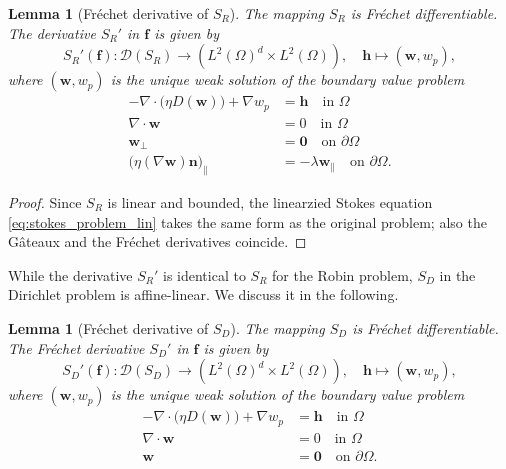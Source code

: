\documentclass[final,leqno]{scrarticle}
\newtheorem{lemma}[theorem]{Lemma}
\newcommand{\lzo}{L^2(\Omega)}
\newcommand{\lzd}{{L^2(\Omega)^d}}
\begin{document}
\begin{lemma}[Fr\'echet derivative of $S_R$]
 The mapping $S_R$ is Fr\'echet differentiable. The %
 derivative ${S_R}'%
 $ in $\mathbf{f}$ is given by
 \begin{displaymath}
  S_R'(\mathbf{f}) : \mathcal{D}(S_R) \to \left(\lzd \times \lzo\right), \quad \mathbf{h} \mapsto (\mathbf{\mathbf{w}},w_p) ,
 \end{displaymath}
 where $\left(\mathbf{\mathbf{w}},w_p\right)$ is the unique weak solution of the boundary value problem
 \begin{equation} \label{eq:stokes_problem_lin}
 \begin{split}
  -\nabla \cdot \big( \eta D(\mathbf{w}) \big) + \nabla w_p &= \mathbf{h} \quad \text{in } \Omega\\
  \nabla \cdot \mathbf{w} &= 0 \quad \text{in } \Omega\\
  \mathbf{w}_{\bot} &= \mathbf{0} \quad \text{on } \partial\Omega \\
  \big(\eta (\nabla \mathbf{w})\mathbf{n} \big)_{\parallel} &= -\lambda \mathbf{w}_{\parallel}\quad \text{on } \partial\Omega.
 \end{split}
\end{equation}
\end{lemma}
\begin{proof}
Since $S_R$ is linear and bounded, the linearzied Stokes equation \eqref{eq:stokes_problem_lin} takes the same form as the original problem; also the G\^ateaux and the Fr\'echet derivatives coincide.

\end{proof}

While the derivative $S_R'$ is identical to $S_R$ for the Robin problem, $S_D$ in the Dirichlet problem is affine-linear. We discuss it in the following. 

\begin{lemma}[Fr\'echet derivative of $S_D$]
 The mapping $S_D$ is Fr\'echet differentiable. The Fr\'echet derivative $S_D'$ in $\mathbf{f}$ is given by
 \begin{equation}
    \label{eq:S_D_frechet}
  S_D'(\mathbf{f}) : \mathcal{D}(S_D) \to \left(\lzd \times \lzo\right), \quad \mathbf{h} \mapsto (\mathbf{w},w_p),
 \end{equation}
 where $\left(\mathbf{\mathbf{w}},w_p\right)$ is the unique weak solution of the boundary value problem
 \begin{displaymath} 
 \begin{split}
  -\nabla \cdot \big( \eta D(\mathbf{w}) \big) + \nabla w_p &= \mathbf{h} \quad \text{in } \Omega\\
  \nabla \cdot \mathbf{w} &= 0 \quad \text{in } \Omega\\
  \mathbf{w} &= \mathbf{0} \quad \text{on } \partial\Omega .
 \end{split}
\end{displaymath}
\end{lemma}
\end{document}
